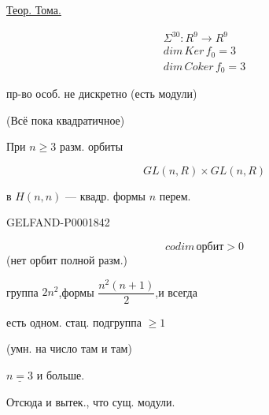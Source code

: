 \underline{Теор. Тома.}

\begin{gather*}
\Sigma^{30}:R^9\longrightarrow R^9\\
dim\,Ker\,f_0=3\\
dim\,Coker\,f_0=3
\end{gather*}

пр-во особ. не дискретно (есть модули)

(Всё пока квадратичное)

 При $n\geq3$ разм. орбиты

\begin{equation*}GL(n,R)\times GL(n,R)\end{equation*}

в $H(n,n)$ — квадр. формы $n$ перем.

\begin{GelfandAdjacentEvidence}{GELFAND-P000184}{2}
\begin{center}
\end{center}
\end{GelfandAdjacentEvidence}

\begin{equation*}codim\,\text{орбит}>0\end{equation*}
(нет орбит полной разм.)

группа $2n^2$,\qquad формы $\dfrac{n^2(n+1)}2$,\qquad и всегда

есть одном. стац. подгруппа $\geq1$

(умн. на число там и там)

$\underline{n=3}$ и больше.

Отсюда и вытек., что сущ. модули.

